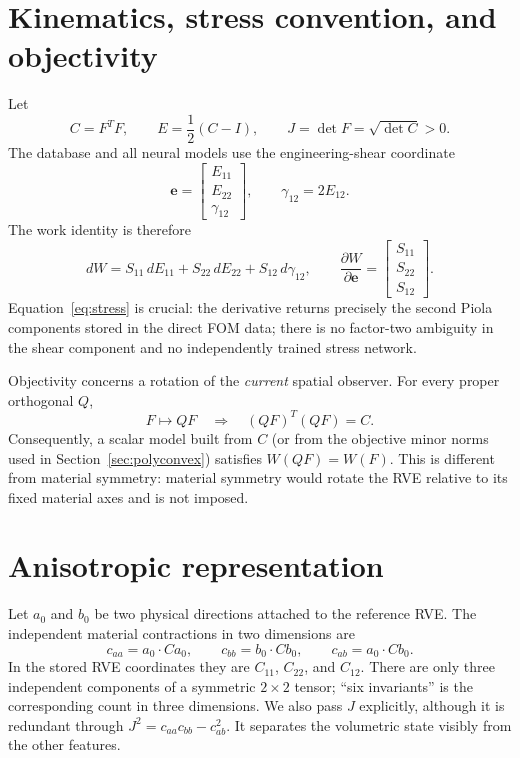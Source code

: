 \documentclass[10pt,a4paper]{article}
\begin{document}
\section{Kinematics, stress convention, and objectivity}
\label{sec:kinematics}
Let
\begin{equation}
 C=F^TF,\qquad E=\frac12(C-I),\qquad J=\det F=\sqrt{\det C}>0.
 \label{eq:kinematics}
\end{equation}
The database and all neural models use the engineering-shear coordinate
\begin{equation}
 \bm e=\begin{bmatrix}E_{11}\\E_{22}\\\gamma_{12}\end{bmatrix},
 \qquad \gamma_{12}=2E_{12}.
 \label{eq:e-coordinate}
\end{equation}
The work identity is therefore
\begin{equation}
 dW=S_{11}\,dE_{11}+S_{22}\,dE_{22}+S_{12}\,d\gamma_{12},\qquad
 \frac{\partial W}{\partial\bm e}
 =\begin{bmatrix}S_{11}\\S_{22}\\S_{12}\end{bmatrix}.
 \label{eq:stress}
\end{equation}
Equation~\eqref{eq:stress} is crucial: the derivative returns precisely the
second Piola components stored in the direct FOM data; there is no factor-two
ambiguity in the shear component and no independently trained stress network.

Objectivity concerns a rotation of the \emph{current} spatial observer.  For
every proper orthogonal $Q$,
\begin{equation}
 F\mapsto QF\quad\Longrightarrow\quad (QF)^T(QF)=C.
\end{equation}
Consequently, a scalar model built from $C$ (or from the objective minor
norms used in Section~\ref{sec:polyconvex}) satisfies
$W(QF)=W(F)$.  This is different from material symmetry: material symmetry
would rotate the RVE relative to its fixed material axes and is not imposed.

\section{Anisotropic representation}
\label{sec:anisotropy}
Let $a_0$ and $b_0$ be two physical directions attached to the reference RVE.
The independent material contractions in two dimensions are
\begin{equation}
 c_{aa}=a_0\cdot Ca_0,\qquad
 c_{bb}=b_0\cdot Cb_0,\qquad
 c_{ab}=a_0\cdot Cb_0.
 \label{eq:structural-c}
\end{equation}
In the stored RVE coordinates they are $C_{11}$, $C_{22}$, and $C_{12}$.
There are only three independent components of a symmetric $2\times2$ tensor;
``six invariants'' is the corresponding count in three dimensions.  We also
pass $J$ explicitly, although it is redundant through
$J^2=c_{aa}c_{bb}-c_{ab}^2$.  It separates the volumetric state visibly from
the other features.
\end{document}
